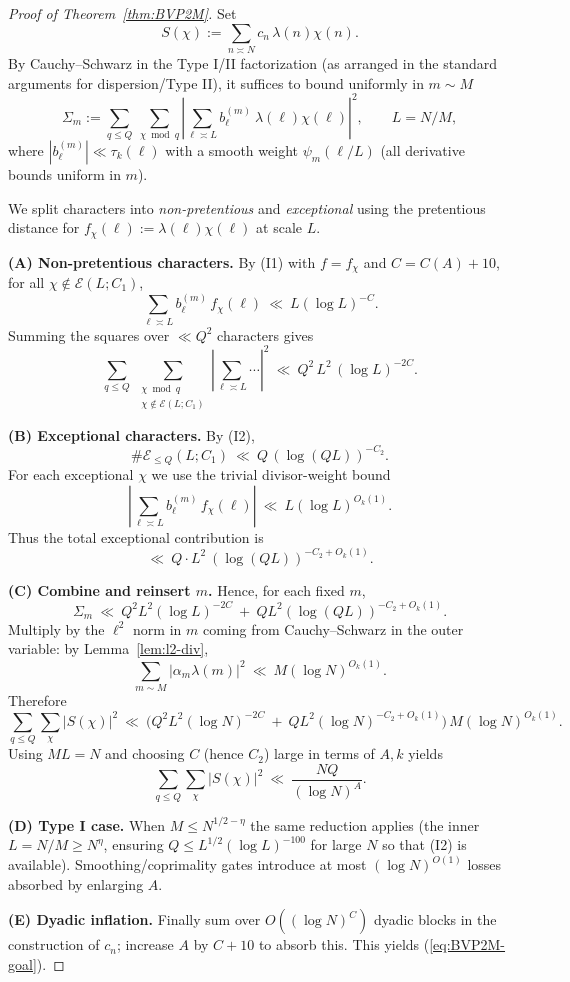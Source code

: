 \documentclass[11pt]{article}
\def\eqref#1{(\ref{#1})}%
\theoremstyle{definition}
\theoremstyle{remark}
\numberwithin{equation}{part}
\begin{document}
\begin{proof}[Proof of Theorem~\ref{thm:BVP2M}]
	Set
	\[
		S(\chi):=\sum_{n\asymp N} c_n\,\lambda(n)\chi(n).
	\]
	By Cauchy–Schwarz in the Type I/II factorization (as arranged in the standard arguments for dispersion/Type II), it suffices to bound uniformly in $m\sim M$
	\[
		\Sigma_m:=\sum_{q\le Q}\ \sum_{\chi\bmod q}\left|\sum_{\ell\asymp L} b^{(m)}_\ell\ \lambda(\ell)\chi(\ell)\right|^2,
		\qquad L=N/M,
	\]
	where $|b^{(m)}_\ell|\ll \tau_k(\ell)$ with a smooth weight $\psi_m(\ell/L)$ (all derivative bounds uniform in $m$).

	We split characters into \emph{non-pretentious} and \emph{exceptional} using the pretentious distance for $f_\chi(\ell):=\lambda(\ell)\chi(\ell)$ at scale $L$.

	\smallskip
	\noindent\textbf{(A) Non-pretentious characters.}
	By (I1) with $f=f_\chi$ and $C=C(A)+10$, for all $\chi\notin\mathcal E(L;C_1)$,
	\[
		\sum_{\ell\asymp L} b^{(m)}_\ell\, f_\chi(\ell)\ \ll\ L(\log L)^{-C}.
	\]
	Summing the squares over $\ll Q^2$ characters gives
	\[
		\sum_{q\le Q}\ \sum_{\substack{\chi\bmod q\\ \chi\notin\mathcal E(L;C_1)}}
		\left|\sum_{\ell\asymp L} \cdots \right|^2
		\ \ll\ Q^2\,L^2\,(\log L)^{-2C}.
	\]

	\smallskip
	\noindent\textbf{(B) Exceptional characters.}
	By (I2),
	\[
		\#\mathcal E_{\le Q}(L;C_1)\ \ll\ Q\,(\log (QL))^{-C_2}.
	\]
	For each exceptional $\chi$ we use the trivial divisor-weight bound
	\[
		\left|\sum_{\ell\asymp L} b^{(m)}_\ell\,f_\chi(\ell)\right|
		\ \ll\ L(\log L)^{O_k(1)}.
	\]
	Thus the total exceptional contribution is
	\[
		\ll\ Q\cdot L^2\ (\log (QL))^{-C_2+O_k(1)}.
	\]

	\smallskip
	\noindent\textbf{(C) Combine and reinsert $m$.}
	Hence, for each fixed $m$,
	\[
		\Sigma_m\ \ll\ Q^2 L^2 (\log L)^{-2C}\ +\ Q L^2 (\log (QL))^{-C_2+O_k(1)}.
	\]
	Multiply by the $\ell^2$ norm in $m$ coming from Cauchy–Schwarz in the outer variable: by Lemma~\ref{lem:l2-div},
	\[
		\sum_{m\sim M} |\alpha_m\lambda(m)|^2\ \ll\ M(\log N)^{O_k(1)}.
	\]
	Therefore
	\[
		\sum_{q\le Q}\sum_{\chi}|S(\chi)|^2
		\ \ll\ \Big(Q^2L^2(\log N)^{-2C}\ +\ QL^2(\log N)^{-C_2+O_k(1)}\Big)\,M(\log N)^{O_k(1)}.
	\]
	Using $ML=N$ and choosing $C$ (hence $C_2$) large in terms of $A,k$ yields
	\[
		\sum_{q\le Q}\sum_{\chi}|S(\chi)|^2\ \ll\ \frac{NQ}{(\log N)^A}.
	\]

	\smallskip
	\noindent\textbf{(D) Type I case.}
	When $M\le N^{1/2-\eta}$ the same reduction applies (the inner $L=N/M\ge N^{\eta}$, ensuring $Q\le L^{1/2}(\log L)^{-100}$ for large $N$ so that (I2) is available). Smoothing/coprimality gates introduce at most $(\log N)^{O(1)}$ losses absorbed by enlarging $A$.

	\smallskip
	\noindent\textbf{(E) Dyadic inflation.}
	Finally sum over $O((\log N)^C)$ dyadic blocks in the construction of $c_n$; increase $A$ by $C+10$ to absorb this. This yields \eqref{eq:BVP2M-goal}.
\end{proof}
\end{document}
